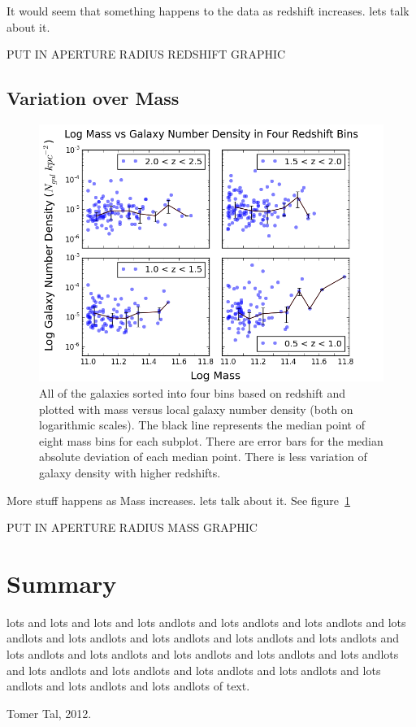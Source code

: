 \documentclass[apj]{emulateapj}
\begin{document}
It would seem that something happens to the data as redshift increases. lets talk about it.

PUT IN APERTURE RADIUS REDSHIFT GRAPHIC

\subsection{Variation over Mass}

\begin{figure}
\centering
\graphicspath{{C:/3d_hst/2015_finals/nth_nearest/}}
\includegraphics[width=\linewidth]{Mass_Density_Z}
\caption{\footnotesize All of the galaxies sorted into four bins based on redshift and plotted with mass versus local galaxy number density (both on logarithmic scales). The black line represents the median point of eight mass bins for each subplot. There are error bars for the median absolute deviation of each median point. There is less variation of galaxy density with higher redshifts.}
\label{fig:nth}
\end{figure}

More stuff happens as Mass increases. lets talk about it. See figure~\ref{fig:nth}

PUT IN APERTURE RADIUS MASS GRAPHIC

\section{Summary}

lots and lots and lots and lots andlots and lots andlots and lots andlots and lots andlots and lots andlots and lots andlots and lots andlots and lots andlots and lots andlots and lots andlots and lots andlots and lots andlots and lots andlots and lots andlots and lots andlots and lots andlots and lots andlots and lots andlots and lots andlots and lots andlots of text.


\acknowledgements

\appendix

\begin{thebibliography}{9}



 Tomer Tal, 2012.

\end{thebibliography}
\end{document}
